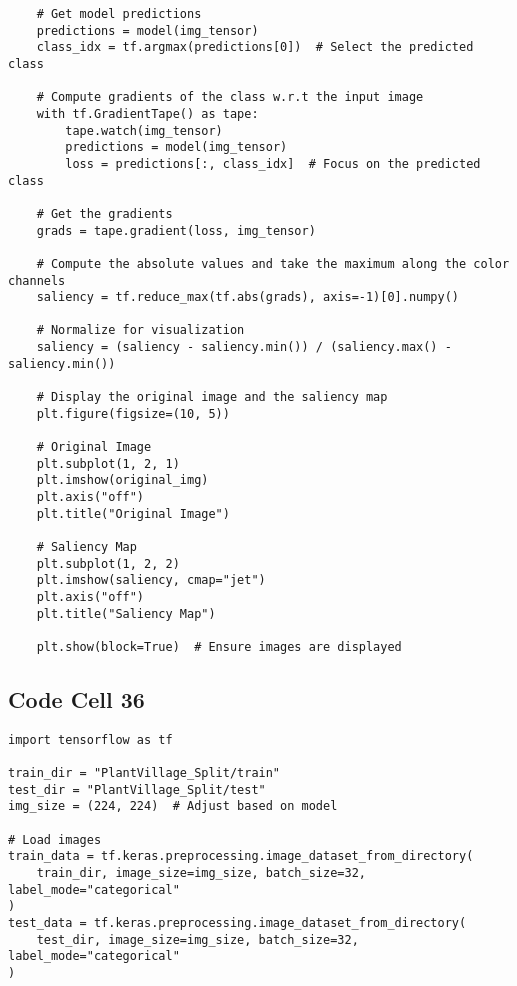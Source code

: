 \documentclass{article}
\begin{document}
\begin{lstlisting}
    # Get model predictions
    predictions = model(img_tensor)
    class_idx = tf.argmax(predictions[0])  # Select the predicted class

    # Compute gradients of the class w.r.t the input image
    with tf.GradientTape() as tape:
        tape.watch(img_tensor)
        predictions = model(img_tensor)
        loss = predictions[:, class_idx]  # Focus on the predicted class

    # Get the gradients
    grads = tape.gradient(loss, img_tensor)

    # Compute the absolute values and take the maximum along the color channels
    saliency = tf.reduce_max(tf.abs(grads), axis=-1)[0].numpy()

    # Normalize for visualization
    saliency = (saliency - saliency.min()) / (saliency.max() - saliency.min())

    # Display the original image and the saliency map
    plt.figure(figsize=(10, 5))

    # Original Image
    plt.subplot(1, 2, 1)
    plt.imshow(original_img)
    plt.axis("off")
    plt.title("Original Image")

    # Saliency Map
    plt.subplot(1, 2, 2)
    plt.imshow(saliency, cmap="jet")
    plt.axis("off")
    plt.title("Saliency Map")

    plt.show(block=True)  # Ensure images are displayed
\end{lstlisting}

\subsection*{Code Cell 36}
\begin{lstlisting}
import tensorflow as tf

train_dir = "PlantVillage_Split/train"
test_dir = "PlantVillage_Split/test"
img_size = (224, 224)  # Adjust based on model

# Load images
train_data = tf.keras.preprocessing.image_dataset_from_directory(
    train_dir, image_size=img_size, batch_size=32, label_mode="categorical"
)
test_data = tf.keras.preprocessing.image_dataset_from_directory(
    test_dir, image_size=img_size, batch_size=32, label_mode="categorical"
)
\end{lstlisting}
\end{document}
